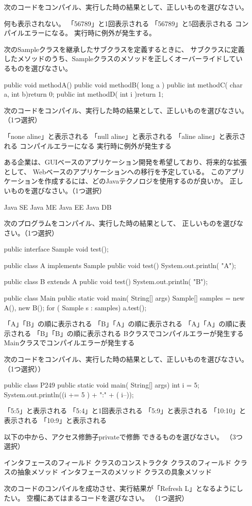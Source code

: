\documentclass[12pt]{jarticle}
\begin{document}
次のコードをコンパイル、実行した時の結果として、正しいものを選びなさい。


何も表示されない。
「56789」と1回表示される
「56789」と5回表示される
コンパイルエラーになる。
実行時に例外が発生する。

次のSampleクラスを継承したサブクラスを定義するときに、
サブクラスに定義したメソッドのうち、Sampleクラスのメソッドを正しくオーバーライドしているものを選びなさい。


public void  methodA(){}
public  void methodB( long a ){}
public int methodC( char a, int b){return 0;}
public int methodD( int i ){return 1;}

次のコードをコンパイル、実行した時の結果として、正しいものを選びなさい。（1つ選択）

「none aline」と表示される
「null aline」と表示される
「aline aline」と表示される
コンパイルエラーになる
実行時に例外が発生する

ある企業は、GUIベースのアプリケーション開発を希望しており、将来的な拡張として、
Webベースのアプリケーションへの移行を予定している。
このアプリケーションを作成するには、どのJavaテクノロジを使用するのが良いか。
正しいものを選びなさい。（1つ選択）

Java SE
Java ME
Java EE
Java DB

次のプログラムをコンパイル、実行した時の結果として、
正しいものを選びなさい。（1つ選択）

public interface Sample {
    void test();
}

public class A implements Sample{
    public void test(){
        System.out.println( "A");
    }
}

public class B extends A {
    public void test(){
        System.out.println( "B");
    }
}

public class Main{
    public  static void main( String[] args){
        Sample[] samples = { new A(), new B()};
        for ( Sample s : samples){
            a.test();
        }
    }
}


「A」「B」の順に表示される
「B」「A」の順に表示される
「A」「A」の順に表示される
「B」「B」の順に表示される
Bクラスでコンパイルエラーが発生する
Mainクラスでコンパイルエラーが発生する

次のコードをコンパイル、実行した時の結果として、正しいものを選びなさい。（1つ選択））

public  class P249 {
    public  static void main( String[] args){
        int i = 5;
        System.out.println((i += 5 ) + ":" + ( i--));
    }
}

「5:5」と表示される
「5:4」と1回表示される
「5:9」と表示される
「10:10」と表示される
「10:9」と表示される

以下の中から、アクセス修飾子privateで修飾
できるものを選びなさい。
（3つ選択）

インタフェースのフィールド
クラスのコンストラクタ
クラスのフィールド
クラスの抽象メソッド
インタフェースのメソッド
クラスの具象メソッド

次のコードのコンパイルを成功させ、実行結果が「Refresh L」となるようにしたい。
空欄にあてはまるコードを選びなさい。
（1つ選択）


\end{document}
